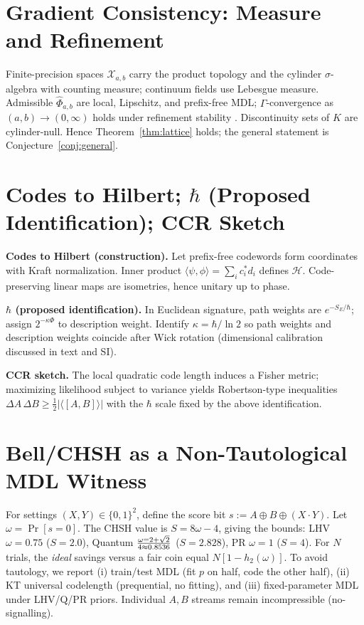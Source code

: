 \documentclass[aps,preprint,onecolumn,longbibliography,nofootinbib]{revtex4-2}
\numberwithin{equation}{section}        %
\begin{document}
\section{Gradient Consistency: Measure and Refinement}\label{app:grad}
Finite-precision spaces $\mathcal X_{a,b}$ carry the product topology and the cylinder $\sigma$-algebra with counting measure; continuum fields use Lebesgue measure. Admissible $\widehat\Phi_{a,b}$ are local, Lipschitz, and prefix-free MDL; $\Gamma$-convergence as $(a,b)\to (0,\infty)$ holds under refinement stability \cite{Braides2002}. Discontinuity sets of $K$ are cylinder-null. Hence Theorem~\ref{thm:lattice} holds; the general statement is Conjecture~\ref{conj:general}.

\section{Codes to Hilbert; $\hbar$ (Proposed Identification); CCR Sketch}\label{app:Q}
\textbf{Codes to Hilbert (construction).} Let prefix-free codewords form coordinates with Kraft normalization. Inner product $\langle \psi,\phi\rangle=\sum_i c_i^* d_i$ defines $\mathcal{H}$. Code-preserving linear maps are isometries, hence unitary up to phase.

\textbf{$\hbar$ (proposed identification).} In Euclidean signature, path weights are $e^{-S_E/\hbar}$; assign $2^{-\kappa \Phi}$ to description weight. Identify $\kappa=\hbar/\ln 2$ so path weights and description weights coincide after Wick rotation (dimensional calibration discussed in text and SI).

\textbf{CCR sketch.} The local quadratic code length induces a Fisher metric; maximizing likelihood subject to variance yields Robertson-type inequalities $\Delta A\,\Delta B\ge \tfrac{1}{2}|\langle[A,B]\rangle|$ with the $\hbar$ scale fixed by the above identification.

\section{Bell/CHSH as a Non-Tautological MDL Witness}\label{app:BELL}
For settings $(X,Y)\in\{0,1\}^2$, define the score bit $s:=A\oplus B\oplus (X\cdot Y)$. Let $\omega=\Pr[s=0]$. The CHSH value is $S=8\omega-4$, giving the bounds:
LHV $\omega=0.75$ ($S=2.0$), Quantum $\omega=2+\sqrt{2}\over 4\approx 0.8536$ ($S=2.828$), PR $\omega=1$ ($S=4$). For $N$ trials, the \emph{ideal} savings versus a fair coin equal $N[1-h_2(\omega)]$.
To avoid tautology, we report (i) train/test MDL (fit $p$ on half, code the other half), (ii) KT universal codelength \cite{KrichevskyTrofimov1981} (prequential, no fitting), and (iii) fixed-parameter MDL under LHV/Q/PR priors. Individual $A,B$ streams remain incompressible (no-signalling).
\end{document}
